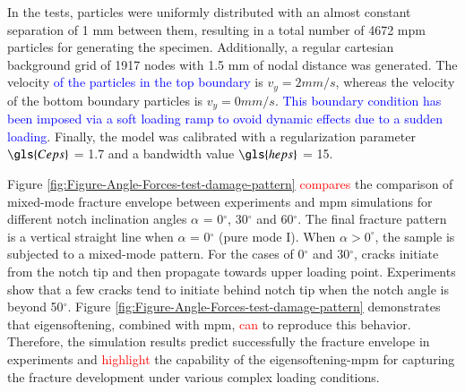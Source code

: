 \documentclass[preprint,12pt,a4paper]{elsarticle}
\begin{document}
In the tests, particles were uniformly distributed with an almost
constant separation of 1 mm between them, resulting in a total number of 4672
\acrshort{mpm} particles for generating the specimen. Additionally, a
regular cartesian background grid of 1917 nodes with 1.5 mm of nodal distance
was generated. The velocity \textcolor{blue}{of the particles in the top boundary} is $v_y = 2 mm/s$, 
whereas the velocity of the bottom boundary particles is $v_y = 0 mm/s$. \textcolor{blue}{This boundary condition has been imposed via a soft loading ramp to ovoid dynamic effects due to a sudden loading}.
Finally, the model was calibrated with a regularization parameter $\gls{Ceps}$ = 1.7 and a
bandwidth value $\gls{heps}$ = 15.

Figure \ref{fig:Figure-Angle-Forces-test-damage-pattern} \textcolor{red}{compares} the
comparison of mixed-mode fracture envelope between experiments and
\acrshort{mpm} simulations for different notch inclination angles
$\alpha$ = 0$^{\circ}$, 30$^{\circ}$ and 60$^{\circ}$. The final
fracture pattern is a vertical straight line when $\alpha$ = 0$^{\circ}$  (pure mode I). 
When $\alpha > 0^{\circ}$, the sample is
subjected to a mixed-mode pattern. For the cases of 0$^{\circ}$ and 30$^{\circ}$, cracks
initiate from the notch tip and then propagate towards upper loading
point. Experiments show that a few cracks tend to initiate behind
notch tip when the notch angle is beyond 50$^{\circ}$. Figure
\ref{fig:Figure-Angle-Forces-test-damage-pattern} demonstrates that
eigensoftening, combined with \acrshort{mpm}, \textcolor{red}{can} to reproduce this
behavior. Therefore, the simulation results predict successfully the
fracture envelope in experiments and \textcolor{red}{highlight} the capability of
the eigensoftening-\acrshort{mpm} for capturing the fracture development under various complex loading conditions. 
\end{document}
